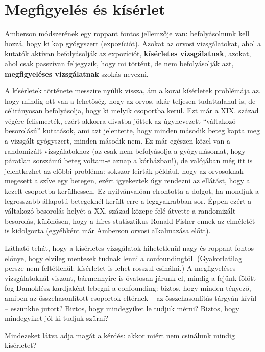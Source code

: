 \documentclass[magyar,]{book}
\begin{document}
\hypertarget{megfigyeluxe9s-uxe9s-kuxedsuxe9rlet}{%
\section{Megfigyelés és kísérlet}\label{megfigyeluxe9s-uxe9s-kuxedsuxe9rlet}}

Amberson módszerének egy roppant fontos jellemzője van: befolyásolnunk kell hozzá, hogy ki kap gyógyszert (expozíciót). Azokat az orvosi vizsgálatokat, ahol a kutatók aktívan befolyásolják az expozíciót, \textbf{kísérletes vizsgálatnak}, azokat, ahol csak passzívan feljegyzik, hogy mi történt, de nem befolyásolják azt, \textbf{megfigyeléses vizsgálatnak} szokás nevezni.

A kísérletek története messzire nyúlik vissza, ám a korai kísérletek problémája az, hogy mindig ott van a lehetőség, hogy az orvos, akár teljesen tudattalanul is, de célirányosan befolyásolja, hogy ki melyik csoportba kerül. Ezt már a XIX. század végére felismerték, ezért akkorra divatba jöttek az úgynevezett \enquote{váltakozó besorolású} kutatások, ami azt jelentette, hogy minden második beteg kapta meg a vizsgált gyógyszert, minden második nem. Ez már egészen közel van a randomizált vizsgálatokhoz (az csak nem befolyásolja a gyógyulásomat, hogy páratlan sorszámú beteg voltam-e aznap a kórházban!), de valójában még itt is jelentkezhet az előbbi probléma: sokszor leírták például, hogy az orvosoknak megesett a szíve egy betegen, ezért igyekeztek úgy rendezni az ellátást, hogy a kezelt csoportba kerülhessen. Ez nyilvánvalóan elrontotta a dolgot, ha mondjuk a legrosszabb állapotú betegeknél került erre a leggyakrabban sor. Éppen ezért a váltakozó besorolás helyét a XX. század közepe felé átvette a randomizált besorolás, különösen, hogy a híres statisztikus Ronald Fisher ennek az elméletét is kidolgozta (egyébként már Amberson orvosi alkalmazása előtt).

Látható tehát, hogy a kísérletes vizsgálatok hihetetlenül nagy és roppant fontos előnye, hogy elvileg mentesek tudnak lenni a confoundingtól. (Gyakorlatilag persze nem feltétlenül: kísérletet is lehet rosszul csinálni.) A megfigyeléses vizsgálatoknál viszont, bármennyire is óvatosan járunk el, mindig a fejünk fölött fog Damoklész kardjaként lebegni a confounding: biztos, hogy minden tényező, amiben az összehasonlított csoportok eltérnek -- az összehasonlítás tárgyán kívül -- eszünkbe jutott? Biztos, hogy mindegyiket le tudjuk mérni? Biztos, hogy mindegyiket jól ki tudjuk szűrni?

Mindezeket látva adja magát a kérdés: akkor miért nem csinálunk mindig kísérletet?
\end{document}
